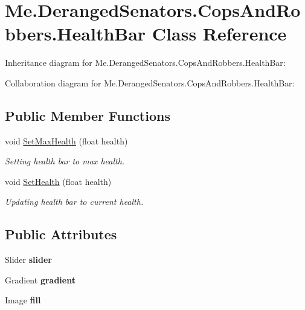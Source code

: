 \hypertarget{classMe_1_1DerangedSenators_1_1CopsAndRobbers_1_1HealthBar}{}\section{Me.\+Deranged\+Senators.\+Cops\+And\+Robbers.\+Health\+Bar Class Reference}
\label{classMe_1_1DerangedSenators_1_1CopsAndRobbers_1_1HealthBar}


Inheritance diagram for Me.\+Deranged\+Senators.\+Cops\+And\+Robbers.\+Health\+Bar\+:


Collaboration diagram for Me.\+Deranged\+Senators.\+Cops\+And\+Robbers.\+Health\+Bar\+:
\subsection*{Public Member Functions}
\begin{DoxyCompactItemize}
\item 
void \hyperlink{classMe_1_1DerangedSenators_1_1CopsAndRobbers_1_1HealthBar_abd40ec4d5b7cfecefe218b991fa860ef}{Set\+Max\+Health} (float health)
\begin{DoxyCompactList}\small\item\em Setting health bar to max health. \end{DoxyCompactList}\item 
void \hyperlink{classMe_1_1DerangedSenators_1_1CopsAndRobbers_1_1HealthBar_ad8565c313239e9f50ec391ab1bfb8574}{Set\+Health} (float health)
\begin{DoxyCompactList}\small\item\em Updating health bar to current health. \end{DoxyCompactList}\end{DoxyCompactItemize}
\subsection*{Public Attributes}
\begin{DoxyCompactItemize}
\item 
\mbox{\label{classMe_1_1DerangedSenators_1_1CopsAndRobbers_1_1HealthBar_a641ed75f6c162396e428bb195a27147e}} 
Slider {\bfseries slider}
\item 
\mbox{\label{classMe_1_1DerangedSenators_1_1CopsAndRobbers_1_1HealthBar_a6e6609cc03f61f8b7675b228f9ab6db0}} 
Gradient {\bfseries gradient}
\item 
\mbox{\label{classMe_1_1DerangedSenators_1_1CopsAndRobbers_1_1HealthBar_a0c1f6109eb57b0b4cd05fc2f9b79bf97}} 
Image {\bfseries fill}
\end{DoxyCompactItemize}


